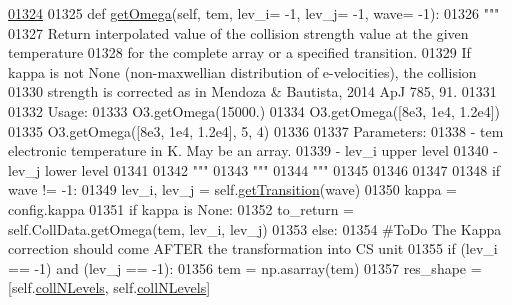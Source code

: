 \begin{DoxyCode}
\hypertarget{classpyneb_1_1core_1_1pynebcore_1_1_atom_l01324}{}\hyperlink{classpyneb_1_1core_1_1pynebcore_1_1_atom_ae133eed382e284df01f2183da341534b}{01324} 
01325     \textcolor{keyword}{def }\hyperlink{classpyneb_1_1core_1_1pynebcore_1_1_atom_ae133eed382e284df01f2183da341534b}{getOmega}(self, tem, lev\_i= -1, lev\_j= -1, wave= -1):
01326         \textcolor{stringliteral}{"""}
01327 \textcolor{stringliteral}{        Return interpolated value of the collision strength value at the given temperature }
01328 \textcolor{stringliteral}{            for the complete array or a specified transition.}
01329 \textcolor{stringliteral}{        If kappa is not None (non-maxwellian distribution of e-velocities), the collision }
01330 \textcolor{stringliteral}{            strength is corrected as in Mendoza & Bautista, 2014 ApJ 785, 91.}
01331 \textcolor{stringliteral}{}
01332 \textcolor{stringliteral}{        Usage:}
01333 \textcolor{stringliteral}{            O3.getOmega(15000.)}
01334 \textcolor{stringliteral}{            O3.getOmega([8e3, 1e4, 1.2e4])}
01335 \textcolor{stringliteral}{            O3.getOmega([8e3, 1e4, 1.2e4], 5, 4)}
01336 \textcolor{stringliteral}{        }
01337 \textcolor{stringliteral}{        Parameters:}
01338 \textcolor{stringliteral}{            - tem    electronic temperature in K. May be an array.}
01339 \textcolor{stringliteral}{            - lev\_i  upper level}
01340 \textcolor{stringliteral}{            - lev\_j  lower level}
01341 \textcolor{stringliteral}{}
01342 \textcolor{stringliteral}{        """}
01343         \textcolor{stringliteral}{"""}
01344 \textcolor{stringliteral}{        """}
01345         
01346         
01347         
01348         \textcolor{keywordflow}{if} wave != -1:
01349             lev\_i, lev\_j = self.\hyperlink{classpyneb_1_1core_1_1pynebcore_1_1_atom_a7c9f17a3d9e841267add92377d9d1ede}{getTransition}(wave)
01350         kappa = config.kappa 
01351         \textcolor{keywordflow}{if} kappa \textcolor{keywordflow}{is} \textcolor{keywordtype}{None}:
01352             to\_return = self.CollData.getOmega(tem, lev\_i, lev\_j)
01353         \textcolor{keywordflow}{else}:
01354             \textcolor{comment}{#ToDo The Kappa correction should come AFTER the transformation into CS unit}
01355             \textcolor{keywordflow}{if} (lev\_i == -1) \textcolor{keywordflow}{and} (lev\_j == -1):
01356                 tem = np.asarray(tem)
01357                 res\_shape = [self.\hyperlink{classpyneb_1_1core_1_1pynebcore_1_1_atom_a8beaa0244d575054b3e2748a5e00d8db}{collNLevels}, self.\hyperlink{classpyneb_1_1core_1_1pynebcore_1_1_atom_a8beaa0244d575054b3e2748a5e00d8db}{collNLevels}]

\end{DoxyCode}
